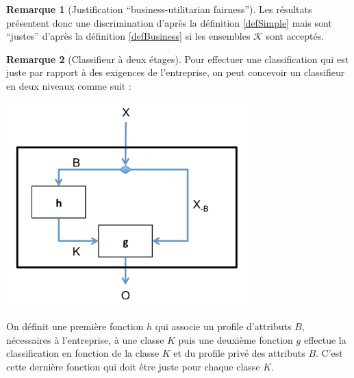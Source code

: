 \documentclass[draft]{article}
\theoremstyle{definition}
\newtheorem{myRem}{Remarque}
\begin{document}
\begin{myRem}[Justification ``business-utilitarian fairness'']
  Les résultats présentent donc une discrimination d'après la définition \ref{defSimple} mais sont ``justes'' d'après la définition \ref{defBusiness} si les ensembles $\mathcal{K}$ sont acceptés.
\end{myRem}

\begin{myRem}[Classifieur à deux étages]
  Pour effectuer une classification qui est juste par rapport à des exigences de l'entreprise, on peut concevoir un classifieur en deux niveaux comme suit :
  \begin{center}
    \includegraphics[width=0.7\textwidth]{twoStageClassifier}
  \end{center}
  On définit une première fonction $h$ qui associe un profile d'attributs $B$, nécessaires à l'entreprise, à une classe $K$ puis une deuxième fonction $g$ effectue la classification en fonction de la classe $K$ et du profile privé des attributs $B$. C'est cette dernière fonction qui doit être juste pour chaque classe $K$.
\end{myRem}
\end{document}
